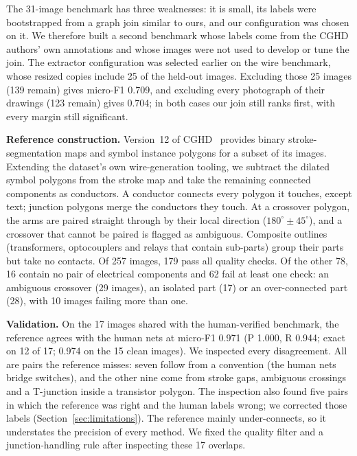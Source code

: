 \documentclass{ieeeaccess}
\begin{document}
The 31-image benchmark has three weaknesses: it is small, its labels were bootstrapped from a graph join similar to ours, and our configuration was chosen on it. We therefore built a second benchmark whose labels come from the CGHD authors' own annotations and whose images were not used to develop or tune the join. The extractor configuration was selected earlier on the wire benchmark, whose resized copies include 25 of the held-out images. Excluding those 25 images (139 remain) gives micro-F1 0.709, and excluding every photograph of their drawings (123 remain) gives 0.704; in both cases our join still ranks first, with every margin still significant.

\textbf{Reference construction.} Version~12 of CGHD~\cite{cghdv12data} provides binary stroke-segmentation maps and symbol instance polygons for a subset of its images. Extending the dataset's own wire-generation tooling, we subtract the dilated symbol polygons from the stroke map and take the remaining connected components as conductors. A conductor connects every polygon it touches, except text; junction polygons merge the conductors they touch. At a crossover polygon, the arms are paired straight through by their local direction ($180^{\circ}\pm45^{\circ}$), and a crossover that cannot be paired is flagged as ambiguous. Composite outlines (transformers, optocouplers and relays that contain sub-parts) group their parts but take no contacts. Of 257 images, 179 pass all quality checks. Of the other 78, 16 contain no pair of electrical components and 62 fail at least one check: an ambiguous crossover (29 images), an isolated part (17) or an over-connected part (28), with 10 images failing more than one.

\textbf{Validation.} On the 17 images shared with the human-verified benchmark, the reference agrees with the human nets at micro-F1 0.971 (P 1.000, R 0.944; exact on 12 of 17; 0.974 on the 15 clean images). We inspected every disagreement. All are pairs the reference misses: seven follow from a convention (the human nets bridge switches), and the other nine come from stroke gaps, ambiguous crossings and a T-junction inside a transistor polygon. The inspection also found five pairs in which the reference was right and the human labels wrong; we corrected those labels (Section~\ref{sec:limitations}). The reference mainly under-connects, so it understates the precision of every method. We fixed the quality filter and a junction-handling rule after inspecting these 17 overlaps.
\end{document}
